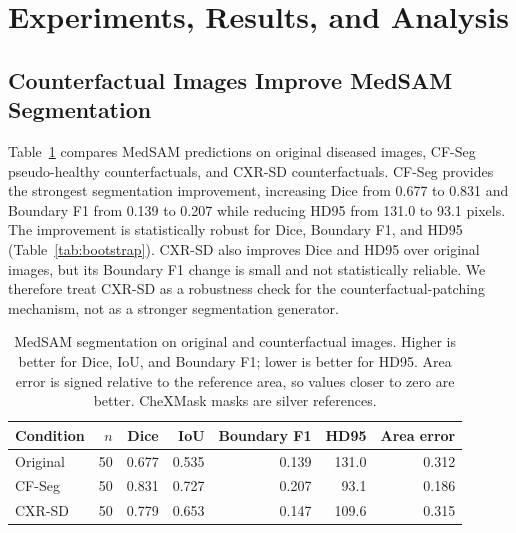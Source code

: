 \documentclass[runningheads]{llncs}
\begin{document}
\section{Experiments, Results, and Analysis}

\subsection{Counterfactual Images Improve MedSAM Segmentation}

Table~\ref{tab:generator_metrics} compares MedSAM predictions on original diseased images, CF-Seg pseudo-healthy counterfactuals, and CXR-SD counterfactuals. CF-Seg provides the strongest segmentation improvement, increasing Dice from 0.677 to 0.831 and Boundary F1 from 0.139 to 0.207 while reducing HD95 from 131.0 to 93.1 pixels. The improvement is statistically robust for Dice, Boundary F1, and HD95 (Table~\ref{tab:bootstrap}). CXR-SD also improves Dice and HD95 over original images, but its Boundary F1 change is small and not statistically reliable. We therefore treat CXR-SD as a robustness check for the counterfactual-patching mechanism, not as a stronger segmentation generator.

\begin{table}
\centering
\caption{MedSAM segmentation on original and counterfactual images. Higher is better for Dice, IoU, and Boundary F1; lower is better for HD95. Area error is signed relative to the reference area, so values closer to zero are better. CheXMask masks are silver references.}
\label{tab:generator_metrics}
\small
\begin{tabular}{lrrrrrr}
\toprule
Condition & $n$ & Dice & IoU & Boundary F1 & HD95 & Area error \\
\midrule
Original & 50 & 0.677 & 0.535 & 0.139 & 131.0 & 0.312 \\
CF-Seg & 50 & 0.831 & 0.727 & 0.207 & 93.1 & 0.186 \\
CXR-SD & 50 & 0.779 & 0.653 & 0.147 & 109.6 & 0.315 \\
\bottomrule
\end{tabular}
\end{table}
\end{document}
